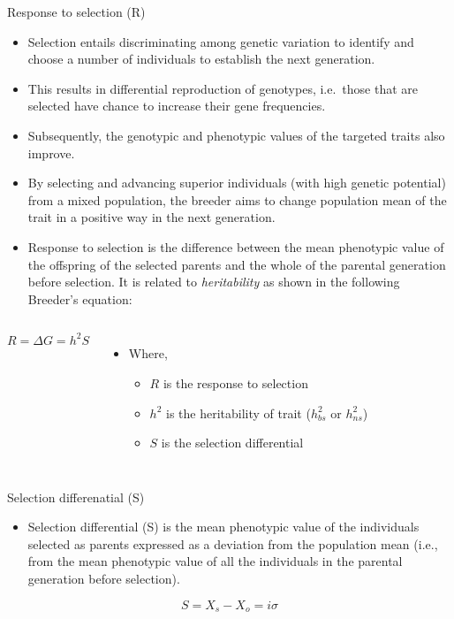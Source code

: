 \documentclass[11pt,ignorenonframetext,aspectratio=169]{beamer}
\providecommand{\tightlist}{%
  \setlength{\itemsep}{0pt}\setlength{\parskip}{0pt}}
\newcommand{\bcolumns}{\begin{columns}[T, onlytextwidth]}
\newcommand{\ecolumns}{\end{columns}}
\begin{document}
\begin{frame}{Response to selection (R)}
\protect\hypertarget{response-to-selection-r}{}
\small

\begin{itemize}
\tightlist
\item
  Selection entails discriminating among genetic variation to identify
  and choose a number of individuals to establish the next generation.
\item
  This results in differential reproduction of genotypes, i.e.~those
  that are selected have chance to increase their gene frequencies.
\item
  Subsequently, the genotypic and phenotypic values of the targeted
  traits also improve.
\item
  By selecting and advancing superior individuals (with high genetic
  potential) from a mixed population, the breeder aims to change
  population mean of the trait in a positive way in the next generation.
\item
  \alert{Response to selection} is the difference between the mean
  phenotypic value of the offspring of the selected parents and the
  whole of the parental generation before selection. It is related to
  \emph{heritability} as shown in the following
  \alert{Breeder's equation}:
\end{itemize}

\bcolumns
{}

\[
R = \Delta G = h^2 S
\] 

\begin{itemize}
\tightlist
\item
  Where,

  \begin{itemize}
  \footnotesize
  \item $R$ is the response to selection
  \item $h^2$ is the heritability of trait ($h^2_{bs}$ or $h^2_{ns}$)
  \item $S$ is the selection differential
  \end{itemize}
\end{itemize}

\ecolumns
\end{frame}

\begin{frame}{Selection differenatial (S)}
\protect\hypertarget{selection-differenatial-s}{}
\begin{itemize}
\tightlist
\item
  \alert{Selection differential (S)} is the mean phenotypic value of the
  individuals selected as parents expressed as a deviation from the
  population mean (i.e., from the mean phenotypic value of all the
  individuals in the parental generation before selection).
\end{itemize}

\[
S = X_s - X_o = i \sigma
\]
\end{frame}
\end{document}
